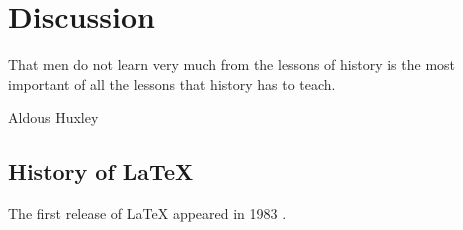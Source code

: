 \section{Discussion}
\label{ch:discussion}

\epigraph{That men do not learn very much from the lessons of history is the most important of all the lessons that history has to teach.}{Aldous Huxley}

\subsection{History of \LaTeX}

The first release of \LaTeX \cite{lamport1994latex} appeared in 1983 \cite{lamport2007writings}.

\cleardoublepage